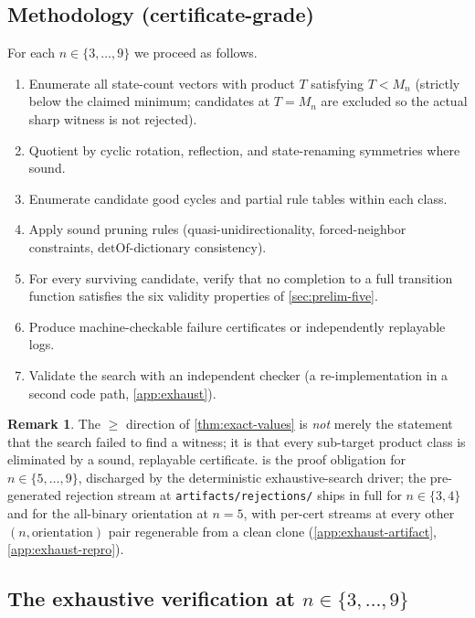 \documentclass[11pt,a4paper]{article}
\theoremstyle{plain}
\theoremstyle{definition}
\newtheorem{remark}[theorem]{Remark}
\newcommand{\Mn}{M_n}
\newcommand{\detOf}{\mathrm{detOf}}
\begin{document}
\subsection{Methodology (certificate-grade)}\label{sec:lower-method}

For each $n \in \{3, \ldots, 9\}$ we proceed as follows.
\begin{enumerate}[leftmargin=*]
\item Enumerate all state-count vectors with product $T$ satisfying
$T < \Mn$ (strictly below the claimed minimum; candidates at $T = \Mn$
are excluded so the actual sharp witness is not rejected).
\item Quotient by cyclic rotation, reflection, and state-renaming
symmetries where sound.
\item Enumerate candidate good cycles and partial rule tables within
each class.
\item Apply sound pruning rules (quasi-unidirectionality,
forced-neighbor constraints, $\detOf$-dictionary consistency).
\item For every surviving candidate, verify that no completion to a
full transition function satisfies the six validity properties of
\cref{sec:prelim-five}.
\item Produce machine-checkable failure certificates or independently
replayable logs.
\item Validate the search with an independent checker (a re-implementation
in a second code path, \cref{app:exhaust}).
\end{enumerate}

\begin{remark}\label{rem:proof-obligation}
The $\ge$ direction of
\cref{thm:exact-values} is \emph{not}
merely the statement that the search failed to find a witness; it
is that every sub-target product class is eliminated by a sound,
replayable certificate.   is the proof obligation
for $n \in \{5, \ldots, 9\}$, discharged by the deterministic
exhaustive-search driver; the pre-generated rejection stream at
\texttt{artifacts/rejections/} ships in full for
$n \in \{3, 4\}$ and for the all-binary orientation at $n = 5$,
with per-cert streams at every other $(n, \text{orientation})$ pair
regenerable from a clean clone (\cref{app:exhaust-artifact},
\cref{app:exhaust-repro}).
\end{remark}

\subsection{The exhaustive verification at $n \in \{3, \ldots, 9\}$}\label{sec:lower-exhaustive}
\end{document}

